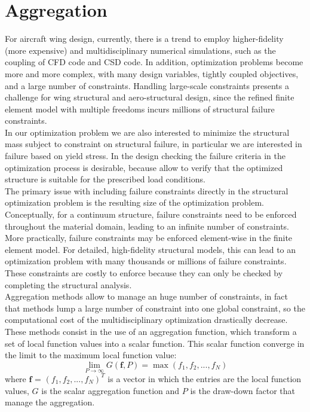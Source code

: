 \section{Aggregation}
For aircraft wing design, currently, there is a trend to employ higher-fidelity (more expensive) and multidisciplinary numerical simulations, such as the coupling of CFD code and CSD code. In addition, optimization problems become more and more complex, with many design variables, tightly coupled objectives, and a large number of constraints. Handling large-scale constraints presents a challenge for wing structural and aero-structural design, since the refined finite element model with multiple freedoms incurs millions of structural failure constraints. \cite{zha}\\
In our optimization problem we are also interested to minimize the structural mass subject to constraint on structural failure, in particular we are interested in failure based on yield stress. In the design checking the failure criteria in the optimization process is desirable, because allow to verify that the optimized structure is suitable for the prescribed load conditions.\\
The primary issue with including failure constraints directly in the structural optimization problem is the resulting size of the optimization problem. Conceptually, for a continuum structure, failure constraints need to be enforced throughout the material domain, leading to an infinite number of constraints. More practically, failure constraints may be enforced element-wise in the finite element model. For detailed, high-fidelity structural models, this can lead to an optimization problem with many thousands or millions of failure constraints. These constraints are costly to enforce because they can only be checked by completing the structural analysis.\cite{lambe}\\
Aggregation methods allow to manage an huge number of constraints, in fact that methods lump a large number of constraint into one global constraint, so the computational cost of the multidisciplinary optimization drastically decrease. These methods consist in the use of an aggregation function, which transform a set of local function values into a scalar function. This scalar function converge in the limit to the maximum local function value:
\begin{equation*}
\lim_{P\to\infty} G(\mathbf{f},P)=\max(f_1,f_2,...,f_N)
\end{equation*}
where $\mathbf{f}$ = $(f_1,f_2,...,f_N)^T$ is a vector in which the entries are the local function values, $G$ is the scalar aggregation function and $P$ is the draw-down factor that manage the aggregation.\\
